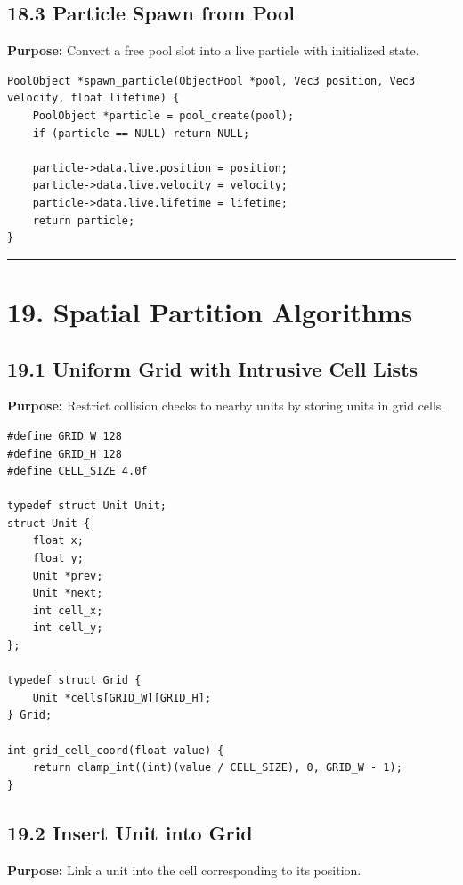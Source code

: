 \documentclass[10pt,letterpaper]{article}
\begin{document}
\subsection{18.3 Particle Spawn from Pool}

\textbf{Purpose:} Convert a free pool slot into a live particle with initialized state.

\begin{verbatim}
PoolObject *spawn_particle(ObjectPool *pool, Vec3 position, Vec3 velocity, float lifetime) {
    PoolObject *particle = pool_create(pool);
    if (particle == NULL) return NULL;

    particle->data.live.position = position;
    particle->data.live.velocity = velocity;
    particle->data.live.lifetime = lifetime;
    return particle;
}
\end{verbatim}

\medskip\hrule\medskip

\clearpage
\section{19. Spatial Partition Algorithms}

\subsection{19.1 Uniform Grid with Intrusive Cell Lists}

\textbf{Purpose:} Restrict collision checks to nearby units by storing units in grid cells.

\begin{verbatim}
#define GRID_W 128
#define GRID_H 128
#define CELL_SIZE 4.0f

typedef struct Unit Unit;
struct Unit {
    float x;
    float y;
    Unit *prev;
    Unit *next;
    int cell_x;
    int cell_y;
};

typedef struct Grid {
    Unit *cells[GRID_W][GRID_H];
} Grid;

int grid_cell_coord(float value) {
    return clamp_int((int)(value / CELL_SIZE), 0, GRID_W - 1);
}
\end{verbatim}

\subsection{19.2 Insert Unit into Grid}

\textbf{Purpose:} Link a unit into the cell corresponding to its position.
\end{document}
